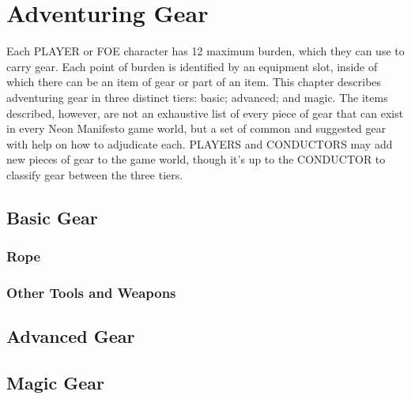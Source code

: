 \section{Adventuring Gear}
Each PLAYER or FOE character has 12 maximum burden, which they can use to carry gear. Each point of burden is identified by an equipment slot, inside of which there can be an item of gear or part of an item. This chapter describes adventuring gear in three distinct tiers: basic; advanced; and magic. The items described, however, are not an exhaustive list of every piece of gear that can exist in every Neon Manifesto game world, but a set of common and suggested gear with help on how to adjudicate each. PLAYERS and CONDUCTORS may add new pieces of gear to the game world, though it's up to the CONDUCTOR to classify gear between the three tiers.

\subsection{Basic Gear}
\begin{multicols}{2}
\subsubsection*{Rope}
\subsubsection*{Other Tools and Weapons}
\end{multicols}

\subsection{Advanced Gear}
\begin{multicols}{2}
\end{multicols}

\subsection{Magic Gear}
\begin{multicols}{2}
\end{multicols}
